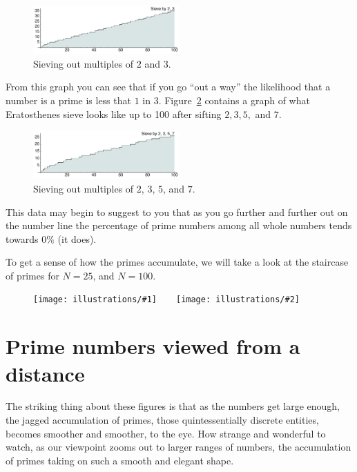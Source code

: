 \documentclass[11pt]{article}
\newcommand{\illtwo}[4]{ 
   \begin{figure}[H]
   \begin{center}
   \texttt{[image: illustrations/\#1]}$\qquad$\texttt{[image: illustrations/\#2]}
   \caption{#4}
    \end{center}
    \end{figure}
}
\theoremstyle{plain}
\theoremstyle{definition}
\numberwithin{equation}{section}
\numberwithin{figure}{section}
\numberwithin{table}{section}
\begin{document}
\begin{figure}[H]
\begin{center}
\includegraphics[width=0.5\textwidth]{illustrations/sieves3_100}
\caption{Sieving out multiples of $2$ and $3$.\label{fig:sieve3_100}}
\end{center}
\end{figure}

From this graph you can see that if you go ``out a way'' the
likelihood that a number is a prime is less that $1$ in $3
$. Figure~\ref{fig:sieve7_100} contains a graph of what Eratosthenes
sieve looks like up to 100 after sifting $2,3,5,$ and $7$.


\begin{figure}[H]
\begin{center}
\includegraphics[width=0.5\textwidth]{illustrations/sieves7_100}
\caption{Sieving out multiples of $2$, $3$, $5$, and $7$.\label{fig:sieve7_100}}
\end{center}
\end{figure}


This data may begin to suggest to you that as you go further and
further out on the number line the percentage of prime numbers among
all whole numbers tends towards $0\%$ (it does).
  

To get a sense of how the primes accumulate, we will take a look at
the staircase of primes for $N= 25$, and $N=100$.


\illtwo{PN_25}{PN_100}{.33}{}

    
    
\section{Prime numbers viewed from a distance}
The striking thing about these figures is that as the numbers get
large enough, the jagged accumulation of primes, those
quintessentially discrete entities, becomes smoother and smoother, to
the eye. How strange and wonderful to watch, as our viewpoint zooms
out to larger ranges of numbers, the accumulation of primes taking on
such a smooth and elegant shape.
\end{document}
